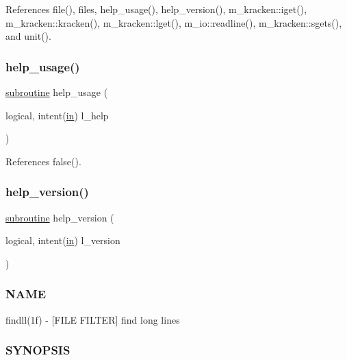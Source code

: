 References file(), files, help\+\_\+usage(), help\+\_\+version(), m\+\_\+kracken\+::iget(), m\+\_\+kracken\+::kracken(), m\+\_\+kracken\+::lget(), m\+\_\+io\+::readline(), m\+\_\+kracken\+::sgets(), and unit().

\mbox{\label{findll_8f90_a3e09a3b52ee8fb04eeb93fe5761626a8}} 
\subsubsection{\texorpdfstring{help\+\_\+usage()}{help\_usage()}}
{\footnotesize\ttfamily \hyperlink{M__stopwatch_83_8txt_acfbcff50169d691ff02d4a123ed70482}{subroutine} help\+\_\+usage (\begin{DoxyParamCaption}\item[{logical, intent(\hyperlink{M__journal_83_8txt_afce72651d1eed785a2132bee863b2f38}{in})}]{l\+\_\+help }\end{DoxyParamCaption})}



References false().

\mbox{\label{findll_8f90_a39c21619b08a3c22f19e2306efd7f766}} 
\subsubsection{\texorpdfstring{help\+\_\+version()}{help\_version()}}
{\footnotesize\ttfamily \hyperlink{M__stopwatch_83_8txt_acfbcff50169d691ff02d4a123ed70482}{subroutine} help\+\_\+version (\begin{DoxyParamCaption}\item[{logical, intent(\hyperlink{M__journal_83_8txt_afce72651d1eed785a2132bee863b2f38}{in})}]{l\+\_\+version }\end{DoxyParamCaption})}



\subsubsection*{N\+A\+ME}

findll(1f) -\/ \mbox{[}F\+I\+LE F\+I\+L\+T\+ER\mbox{]} find long lines \subsubsection*{S\+Y\+N\+O\+P\+S\+IS}

